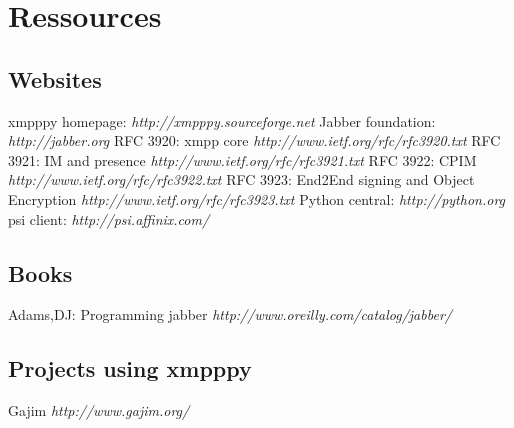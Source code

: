 \chapter{Ressources}


\section{Websites}
xmpppy homepage:		\textit{http://xmpppy.sourceforge.net}
\newline
Jabber foundation:		\textit{http://jabber.org}
\newline
\newline
RFC 3920: xmpp core		\textit{http://www.ietf.org/rfc/rfc3920.txt}
\newline
RFC 3921: IM and presence	\textit{http://www.ietf.org/rfc/rfc3921.txt}
\newline
RFC 3922: CPIM			\textit{http://www.ietf.org/rfc/rfc3922.txt}
\newline
RFC 3923: End2End signing and Object Encryption	\textit{http://www.ietf.org/rfc/rfc3923.txt}
\newline
\newline
Python central:			\textit{http://python.org}
\newline
psi client:			\textit{http://psi.affinix.com/}

\section{Books}
Adams,DJ: Programming jabber	\textit{http://www.oreilly.com/catalog/jabber/}

\section{Projects using xmpppy}
Gajim				\textit{http://www.gajim.org/}